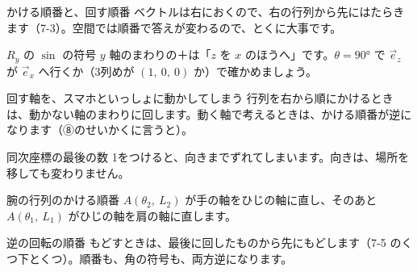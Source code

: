 
\begin{tsumazuki}{かける順番と、回す順番}
ベクトルは右におくので、右の行列から先にはたらきます（7-3）。空間では順番で答えが変わるので、とくに大事です。
\end{tsumazuki}

\begin{tsumazuki}{$R_y$ の $\sin$ の符号}
$y$ 軸のまわりの＋は「$z$ を $x$ のほうへ」です。$\theta=90°$ で $\vec e_z$ が $\vec e_x$ へ行くか（3列めが $(1,\ 0,\ 0)$ か）で確かめましょう。
\end{tsumazuki}

\begin{tsumazuki}{回す軸を、スマホといっしょに動かしてしまう}
行列を右から順にかけるときは、動かない軸のまわりに回します。動く軸で考えるときは、かける順番が逆になります（⑧のせいかくに言うと）。
\end{tsumazuki}

\begin{tsumazuki}{同次座標の最後の数}
1をつけると、向きまでずれてしまいます。向きは、場所を移しても変わりません。
\end{tsumazuki}

\begin{tsumazuki}{腕の行列のかける順番}
$A(\theta_2,\ L_2)$ が手の軸をひじの軸に直し、そのあと $A(\theta_1,\ L_1)$ がひじの軸を肩の軸に直します。
\end{tsumazuki}

\begin{tsumazuki}{逆の回転の順番}
もどすときは、最後に回したものから先にもどします（7-5 のくつ下とくつ）。順番も、角の符号も、両方逆になります。
\end{tsumazuki}

